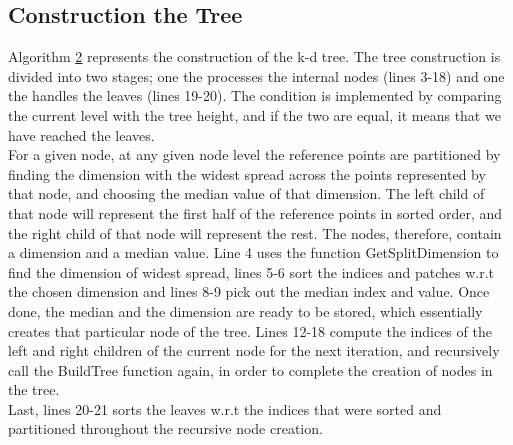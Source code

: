 \subsection{Construction the Tree}

Algorithm \hyperref[alg:tree]{2} represents the construction of the k-d tree. The tree construction is divided into two stages; one the processes the internal nodes (lines 3-18) and one the handles the leaves (lines 19-20). 
The condition is implemented by comparing the current level with the tree height, and if the two are equal, it means that we have reached the leaves. 
\\[2mm]
For a given node, at any given node level the reference points are partitioned by finding the dimension with the widest spread across the points represented by that node, and choosing the median value of that dimension. The left child of that node will represent the first half of the reference points in sorted order, and the right child of that node will represent the rest. 
The nodes, therefore, contain a dimension and a median value. Line 4 uses the function GetSplitDimension to find the dimension of widest spread, lines 5-6 sort the indices and patches w.r.t the chosen dimension and lines 8-9 pick out the median index and value. Once done, the median and the dimension are ready to be stored, which essentially creates that particular node of the tree. Lines 12-18 compute the indices of the left and right children of the current node for the next iteration, and recursively call the BuildTree function again, in order to complete the creation of nodes in the tree. 
\\[2mm]
Last, lines 20-21 sorts the leaves w.r.t the indices that were sorted and partitioned throughout the recursive node creation.


